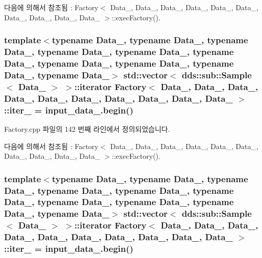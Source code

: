 다음에 의해서 참조됨 \+:  Factory$<$ Data\+\_, Data\+\_, Data\+\_, Data\+\_, Data\+\_, Data\+\_, Data\+\_, Data\+\_, Data\+\_, Data\+\_ $>$\+::exec\+Factory().

\subsubsection[{\texorpdfstring{iter\+\_\+2}{iter_2}}]{\setlength{\rightskip}{0pt plus 5cm}template$<$typename Data\+\_, typename Data\+\_, typename Data\+\_, typename Data\+\_, typename Data\+\_, typename Data\+\_, typename Data\+\_, typename Data\+\_, typename Data\+\_, typename Data\+\_$>$ std\+::vector$<$ dds\+::sub\+::\+Sample$<$ Data\+\_ $>$ $>$\+::iterator {\bf Factory}$<$ Data\+\_, Data\+\_, Data\+\_, Data\+\_, Data\+\_, Data\+\_, Data\+\_, Data\+\_, Data\+\_, Data\+\_ $>$\+::iter\+\_ = input\+\_\+data\+\_.\+begin()}\hypertarget{classFactory_a018adc4b2d04e5ed2f71dca5261a353e}{}\label{classFactory_a018adc4b2d04e5ed2f71dca5261a353e}


Factory.\+cpp 파일의 142 번째 라인에서 정의되었습니다.



다음에 의해서 참조됨 \+:  Factory$<$ Data\+\_, Data\+\_, Data\+\_, Data\+\_, Data\+\_, Data\+\_, Data\+\_, Data\+\_, Data\+\_, Data\+\_ $>$\+::exec\+Factory().

\subsubsection[{\texorpdfstring{iter\+\_\+3}{iter_3}}]{\setlength{\rightskip}{0pt plus 5cm}template$<$typename Data\+\_, typename Data\+\_, typename Data\+\_, typename Data\+\_, typename Data\+\_, typename Data\+\_, typename Data\+\_, typename Data\+\_, typename Data\+\_, typename Data\+\_$>$ std\+::vector$<$ dds\+::sub\+::\+Sample$<$ Data\+\_ $>$ $>$\+::iterator {\bf Factory}$<$ Data\+\_, Data\+\_, Data\+\_, Data\+\_, Data\+\_, Data\+\_, Data\+\_, Data\+\_, Data\+\_, Data\+\_ $>$\+::iter\+\_ = input\+\_\+data\+\_.\+begin()}\hypertarget{classFactory_adbd632440369980117032c2ba154eadb}{}\label{classFactory_adbd632440369980117032c2ba154eadb}


